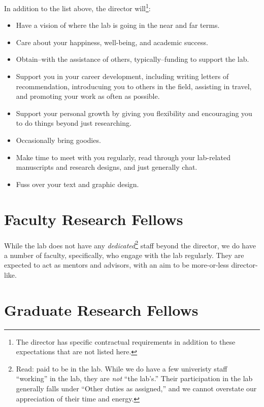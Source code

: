 \documentclass[]{tufte-book}
\providecommand{\tightlist}{%
  \setlength{\itemsep}{0pt}\setlength{\parskip}{0pt}}
\begin{document}
In addition to the list above, the director will\footnote{The director has specific contractual requirements in addition to these expectations that are not listed here.}:

\begin{itemize}
\tightlist
\item
  Have a vision of where the lab is going in the near and far terms.
\item
  Care about your happiness, well-being, and academic success.
\item
  Obtain--with the assistance of others, typically--funding to support the lab.
\item
  Support you in your career development, including writing letters of recommendation, introducuing you to others in the field, assisting in travel, and promoting your work as often as possible.
\item
  Support your personal growth by giving you flexibility and encouraging you to do things beyond just researching.
\item
  Occasionally bring goodies.
\item
  Make time to meet with you regularly, read through your lab-related manuscripts and research designs, and just generally chat.
\item
  Fuss over your text and graphic design.
\end{itemize}

\hypertarget{faculty-research-fellows}{%
\section{Faculty Research Fellows}\label{faculty-research-fellows}}

While the lab does not have any \emph{dedicated}\footnote{Read: paid to be in the lab. While we do have a few univeristy staff ``working'' in the lab, they are \emph{not} ``the lab's.'' Their participation in the lab generally falls under ``Other duties as assigned,'' and we cannot overstate our appreciation of their time and energy.} staff beyond the director, we do have a number of faculty, specifically, who engage with the lab regularly. They are expected to act as mentors and advisors, with an aim to be more-or-less director-like.

\hypertarget{graduate-research-fellows}{%
\section{Graduate Research Fellows}\label{graduate-research-fellows}}
\end{document}
